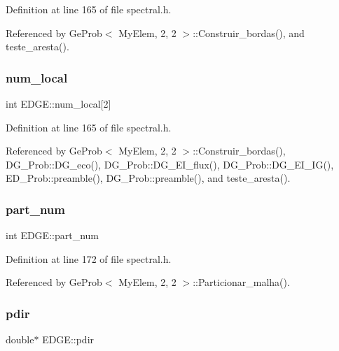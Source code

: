 Definition at line 165 of file spectral.\+h.



Referenced by Ge\+Prob$<$ My\+Elem, 2, 2 $>$\+::\+Construir\+\_\+bordas(), and teste\+\_\+aresta().

\mbox{\label{structEDGE_a90bb5dbccfbd03011a1d804e35cfe14c}} 
\subsubsection{\texorpdfstring{num\+\_\+local}{num\_local}}
{\footnotesize\ttfamily int E\+D\+G\+E\+::num\+\_\+local\mbox{[}2\mbox{]}}



Definition at line 165 of file spectral.\+h.



Referenced by Ge\+Prob$<$ My\+Elem, 2, 2 $>$\+::\+Construir\+\_\+bordas(), D\+G\+\_\+\+Prob\+::\+D\+G\+\_\+eco(), D\+G\+\_\+\+Prob\+::\+D\+G\+\_\+\+E\+I\+\_\+flux(), D\+G\+\_\+\+Prob\+::\+D\+G\+\_\+\+E\+I\+\_\+\+I\+G(), E\+D\+\_\+\+Prob\+::preamble(), D\+G\+\_\+\+Prob\+::preamble(), and teste\+\_\+aresta().

\mbox{\label{structEDGE_a141ff580277e62d4726b4bdc4f6b8f2f}} 
\subsubsection{\texorpdfstring{part\+\_\+num}{part\_num}}
{\footnotesize\ttfamily int E\+D\+G\+E\+::part\+\_\+num}



Definition at line 172 of file spectral.\+h.



Referenced by Ge\+Prob$<$ My\+Elem, 2, 2 $>$\+::\+Particionar\+\_\+malha().

\mbox{\label{structEDGE_a8f7ef1d58c0bb5e80eaddf6bdba5e67e}} 
\subsubsection{\texorpdfstring{pdir}{pdir}}
{\footnotesize\ttfamily double$\ast$ E\+D\+G\+E\+::pdir}



